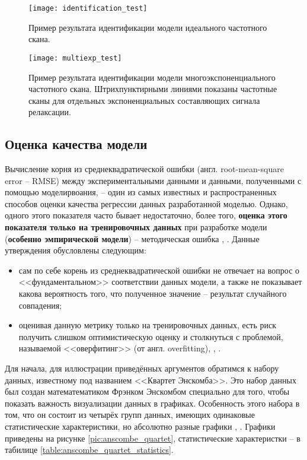     \begin{figure}[!htp]
        \centering
        \texttt{[image: identification\_test]}
        \caption{Пример результата идентификации модели идеального частотного 
        скана.}
        \label{pic:identification_test}
    \end{figure}


    \begin{figure}[!htp]
        \centering
        \texttt{[image: multiexp\_test]}
        \caption{Пример результата идентификации модели многоэкспоненциального
        частотного скана. Штрихпунктирными линиями показаны частотные сканы для
        отдельных экспоненциальных составляющих сигнала релаксации.}
        \label{pic:multiexp_test}
    \end{figure}


    \subsection{Оценка качества модели}
    Вычисление корня из среднеквадратической ошибки (англ. root-mean-square 
    error -- RMSE) между экспериментальными данными и данными, полученными с 
    помощью моделирвоания, -- один из самых известных и распространенных 
    способов оценки качества регрессии данных разработанной моделью. Однако, 
    одного этого показателя часто бывает недостаточно, более того, 
    \textbf{оценка этого показателя только на тренировочных данных} при 
    разработке модели (\textbf{особенно эмпирической модели}) -- методическая 
    ошибка \cite{hands_on_ml}, \cite{sklearn_cross_validation}. Данные 
    утверждения обусловлены следующим:
    \begin{itemize}
    	\item сам по себе корень из среднеквадратической ошибки не отвечает на 
    	вопрос о <<фундаментальном>> соответствии данных модели, а также не 
    	показывает какова вероятность того, что полученное значение -- результат 
    	случайного совпадения;
    	\item оценивая данную метрику только на тренировочных данных, есть риск
    	получить слишком оптимистическую оценку и столкнуться с проблемой, 
    	называемой <<оверфитинг>> (от англ. overfitting)\cite{hands_on_ml}, 
    	\cite{sklearn_cross_validation}, \cite{nikolenko_deep_learning}.
    \end{itemize}

    Для начала, для иллюстрации приведённых аргументов обратимся к набору 
    данных, известному под названием <<Квартет Энскомба>>. Это набор данных был 
    создан математематиком Фрэнком Энскомбом специально для того, чтобы показать
    важность визуализации данных в графиках. Особенность этого набора в том, что
    он состоит из четырёх групп данных, имеющих одинаковые статистические 
    характеристики, но абсолютно разные графики \cite{anscombe_quartet_wikipedia}, 
    \cite{anscombe_quartet_article}. Графики приведены на рисунке 
    \ref{pic:anscombe_quartet}, статистические характеристки -- в табилице 
    \ref{table:anscombe_quartet_statistics}.

